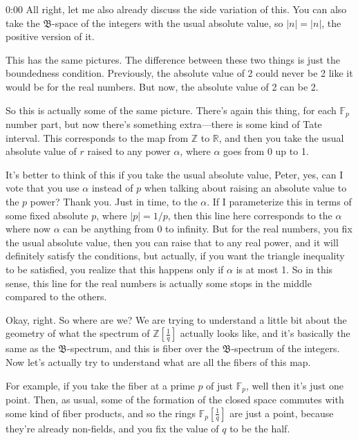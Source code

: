 \begin{unfinished}{0:00}
All right, let me also already discuss the side variation of this. You can also take the $\mathfrak{B}$-space of the integers with the usual absolute value, so $\lvert n \rvert = |n|$, the positive version of it. 

This has the same pictures. The difference between these two things is just the boundedness condition. Previously, the absolute value of 2 could never be 2 like it would be for the real numbers. But now, the absolute value of 2 can be 2.

So this is actually some of the same picture. There's again this thing, for each $\mathbb{F}_p$ number part, but now there's something extra---there is some kind of Tate interval. This corresponds to the map from $\mathbb{Z}$ to $\mathbb{R}$, and then you take the usual absolute value of $r$ raised to any power $\alpha$, where $\alpha$ goes from 0 up to 1. 

It's better to think of this if you take the usual absolute value, Peter, yes, can I vote that you use $\alpha$ instead of $p$ when talking about raising an absolute value to the $p$ power? Thank you. Just in time, to the $\alpha$. If I parameterize this in terms of some fixed absolute $p$, where $|p| = 1/p$, then this line here corresponds to the $\alpha$ where now $\alpha$ can be anything from 0 to infinity. But for the real numbers, you fix the usual absolute value, then you can raise that to any real power, and it will definitely satisfy the conditions, but actually, if you want the triangle inequality to be satisfied, you realize that this happens only if $\alpha$ is at most 1. So in this sense, this line for the real numbers is actually some stops in the middle compared to the others.

Okay, right. So where are we? We are trying to understand a little bit about the geometry of what the spectrum of $\mathbb{Z}[\frac{1}{q}]$ actually looks like, and it's basically the same as the $\mathfrak{B}$-spectrum, and this is fiber over the $\mathfrak{B}$-spectrum of the integers. Now let's actually try to understand what are all the fibers of this map.

For example, if you take the fiber at a prime $p$ of just $\mathbb{F}_p$, well then it's just one point. Then, as usual, some of the formation of the closed space commutes with some kind of fiber products, and so the rings $\mathbb{F}_p[\frac{1}{q}]$ are just a point, because they're already non-fields, and you fix the value of $q$ to be the half.


\end{unfinished}

